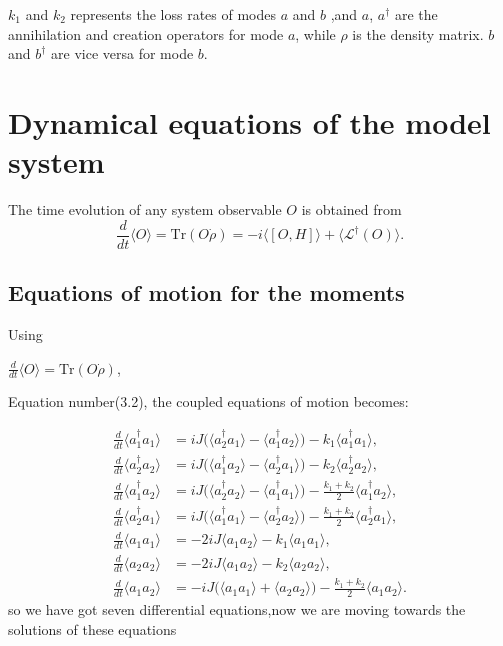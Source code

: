 $k_1$ and $k_2$ represents the loss rates of modes $a$ and $b$ ,and $a$, $a^{\dagger}$ are the annihilation and creation operators for mode $a$, while $\rho$ is the density matrix.  $b$ and $b^{\dagger}$ are vice versa for mode $b$.

\section{Dynamical equations of the model system}

The time evolution of any system observable $O$ is obtained from
\begin{equation}
	\frac{d}{dt}\langle O\rangle
	= \mathrm{Tr}(O\dot{\rho})
	= -i\langle[O,H]\rangle + \langle \mathcal{L}^\dagger(O)\rangle .
\end{equation}

\subsection{Equations of motion for the moments}

Using

$\frac{d}{dt}\langle O\rangle=\mathrm{Tr}(O\dot{\rho})$,

Equation number(3.2), the coupled equations of motion becomes:


\begin{align}
	\frac{d}{dt}\langle a_1^\dagger a_1\rangle
	&= iJ\Big(\langle a_2^\dagger a_1\rangle-\langle a_1^\dagger a_2\rangle\Big)
	- k_1\langle a_1^\dagger a_1\rangle, \\[6pt]
	\frac{d}{dt}\langle a_2^\dagger a_2\rangle
	&= iJ\Big(\langle a_1^\dagger a_2\rangle-\langle a_2^\dagger a_1\rangle\Big)
	- k_2\langle a_2^\dagger a_2\rangle, \\[6pt]
	\frac{d}{dt}\langle a_1^\dagger a_2\rangle
	&= iJ\Big(\langle a_2^\dagger a_2\rangle-\langle a_1^\dagger a_1\rangle\Big)
	-\frac{k_1+k_2}{2}\langle a_1^\dagger a_2\rangle, \\[6pt]
	\frac{d}{dt}\langle a_2^\dagger a_1\rangle
	&= iJ\Big(\langle a_1^\dagger a_1\rangle-\langle a_2^\dagger a_2\rangle\Big)
	-\frac{k_1+k_2}{2}\langle a_2^\dagger a_1\rangle, \\[10pt]
	\frac{d}{dt}\langle a_1 a_1\rangle
	&= -2iJ\langle a_1 a_2\rangle
	- k_1\langle a_1 a_1\rangle, \\[6pt]
	\frac{d}{dt}\langle a_2 a_2\rangle
	&= -2iJ\langle a_1 a_2\rangle
	- k_2\langle a_2 a_2\rangle, \\[6pt]
	\frac{d}{dt}\langle a_1 a_2\rangle
	&= -iJ\Big(\langle a_1 a_1\rangle+\langle a_2 a_2\rangle\Big)
	-\frac{k_1+k_2}{2}\langle a_1 a_2\rangle.
\end{align}
so we have got seven differential equations,now we are moving towards the solutions of these equations


